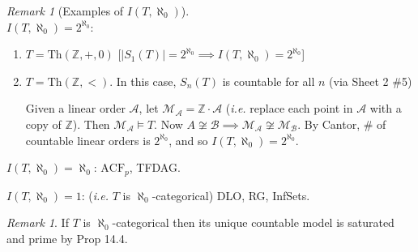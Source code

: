 \documentclass[]{article}
\theoremstyle{custhm}
\theoremstyle{cusdef}
\theoremstyle{custhm}
\theoremstyle{custhm}
\theoremstyle{custhm}
\theoremstyle{ex}
\theoremstyle{custhm}
\theoremstyle{cusdef}
\theoremstyle{remark}
\newtheorem*{remark*}{Remark}
\theoremstyle{remark}
\newtheorem{remark}[theorem]{Remark}
\theoremstyle{numremark}
\newcommand{\Z}{\mathbb{Z}}
\renewcommand{\it}[1]{\textit{#1}}
\newcommand{\M}{\mathcal{M}}
\newcommand{\Th}{\textrm{Th}}
\newcommand{\acf}{\textrm{ACF}}
\newcommand{\A}{\mathcal{A}}
\begin{document}
\begin{remark*}[Examples of $I(T,\aleph_0)$]\ \\
	\underline{$I(T,\aleph_0) = 2^{\aleph_0}$}:\ 
	\begin{enumerate}
		\item $T = \Th(\Z,+,0)$ [$|S_1(T)| = 2^{\aleph_0}\implies I(T,\aleph_0) = 2^{\aleph_0}$]
		\item $T = \Th(\Z,<)$. In this case, $S_n(T)$ is countable for all $n$ (via Sheet 2 \#5)
		
		Given a linear order $\A$, let $\M_\A = \Z\cdot \A$ (\it{i.e.} replace each point in $\A$ with a copy of $\Z$). Then $\M_\A\models T$. Now $A\not\cong \mathcal{B} \implies \M_\A \not\cong \M_{\mathcal{B}}$. By Cantor, \# of countable linear orders is $2^{\aleph_0}$, and so $I(T,\aleph_0) = 2^{\aleph_0}$.
	\end{enumerate}

	\underline{$I(T,\aleph_0) = \aleph_0$}: $\acf_p$, TFDAG.

	\underline{$I(T,\aleph_0) = 1$}: (\it{i.e.} $T$ is $\aleph_0$-categorical) DLO, RG, InfSets.
\end{remark*}

\begin{remark}
	If $T$ is $\aleph_0$-categorical then its unique countable model is saturated and prime by Prop 14.4.
\end{remark}
\end{document}
